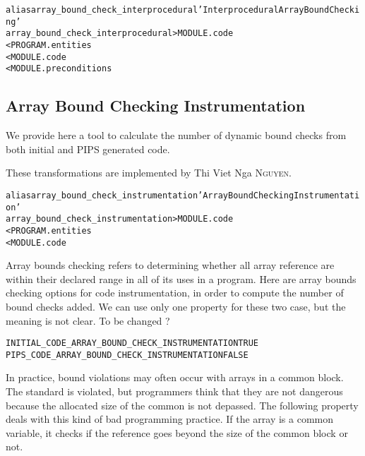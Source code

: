\documentclass[a4paper]{report}
\newenvironment{PipsProp}{\begin{alltt}}{\end{alltt}}
\newenvironment{PipsMake}{\begin{alltt}}{\end{alltt}}
\begin{document}
\begin{PipsMake}
alias array_bound_check_interprocedural 'Interprocedural Array Bound Checking'
array_bound_check_interprocedural             > MODULE.code
        < PROGRAM.entities
        < MODULE.code
        < MODULE.preconditions
\end{PipsMake}


\subsection{Array Bound Checking Instrumentation}
\label{subsection-array-bound-check_instrumentation}


We provide here a tool to calculate the number of dynamic bound checks
from both initial and PIPS generated code.

These transformations are implemented by Thi Viet Nga \textsc{Nguyen}.

\begin{PipsMake}
alias array_bound_check_instrumentation 'Array Bound Checking Instrumentation'
array_bound_check_instrumentation > MODULE.code
        < PROGRAM.entities
        < MODULE.code
\end{PipsMake}



Array bounds checking refers to determining whether all array reference
are within their declared range in all of its uses in a program. Here are
array bounds checking options for code instrumentation, in order to
compute the number of bound checks added. We can use only one property for
these two case, but the meaning is not clear. To be changed ?

\begin{PipsProp}
INITIAL_CODE_ARRAY_BOUND_CHECK_INSTRUMENTATION TRUE
PIPS_CODE_ARRAY_BOUND_CHECK_INSTRUMENTATION FALSE
\end{PipsProp}

In practice, bound violations may often occur with arrays in a common block. The
standard is violated, but programmers think that they are not dangerous
because the allocated size of the common is not depassed. 
The following property deals with this kind of bad programming practice. If the
array is a common variable, it checks if the reference goes beyond the
size of the common block or not.
\end{document}
